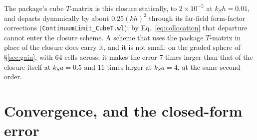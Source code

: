 \documentclass[11pt,a4paper]{article}
\newcommand{\nb}[1]{\texttt{#1}}
\begin{document}
The package's cube $T$-matrix is this closure statically, to $2\times10^{-5}$ at $k_Sh=0.01$, and departs
dynamically by about $0.25(kh)^2$ through its far-field form-factor corrections
(\nb{ContinuumLimit\_CubeT.wl}); by Eq.~\eqref{eq:collocation} that departure cannot enter the closure scheme.
A scheme that uses the package $T$-matrix in place of the closure does carry it, and it is not small: on
the graded sphere of \S\ref{sec:gain}, with $64$ cells across, it makes the error $7$ times larger than
that of the closure itself at $k_Sa=0.5$ and $11$ times larger at $k_Sa=4$, at the same second order.

\section{Convergence, and the closed-form error}\label{sec:convergence}
\end{document}

